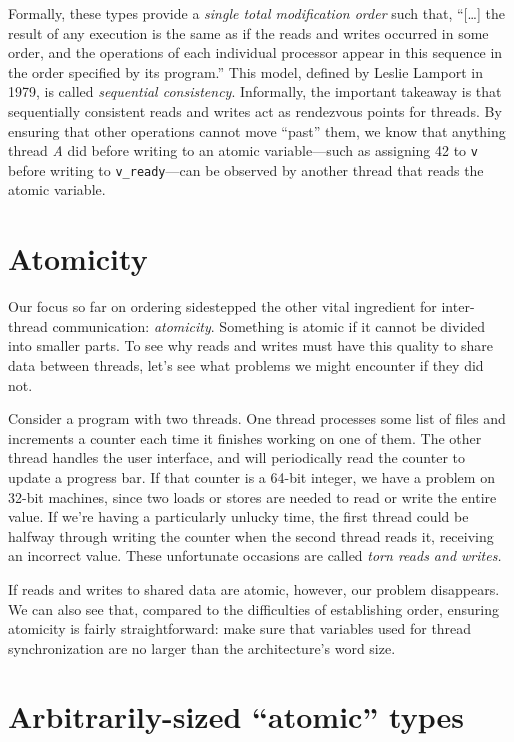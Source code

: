 \documentclass[fontsize=10pt, numbers=endperiod]{scrartcl}
\newcommand{\monobox}[1]{\mbox{\texttt{#1}}}
\newcommand{\introduce}[1]{\textit{#1}}
\begin{document}
\begin{multicols*}{2}
Formally, these types provide a \textit{single total modification order}
such that,
``[\ldots] the result of any execution is the same as if the reads and writes
occurred in some order, and the operations of each individual
processor appear in this sequence in the order specified by its program.''
This model, defined by Leslie Lamport in 1979,
is called \introduce{sequential consistency}.
Informally, the important takeaway is that sequentially consistent reads
and writes act as rendezvous points for threads.
By ensuring that other operations cannot move ``past'' them,
we know that anything thread \textit{A} did before writing to an atomic
variable---such as assigning 42 to \texttt{v} before writing to
\monobox{v\_ready}---can be observed by another thread that reads the
atomic variable.

\section{Atomicity}
\label{atomicity}

Our focus so far on ordering sidestepped the other vital ingredient for
inter-thread communication: \introduce{atomicity}.
Something is atomic if it cannot be divided into smaller parts.
To see why reads and writes must have this quality to share data between threads,
let's see what problems we might encounter if they did not.

Consider a program with two threads.
One thread processes some list of files
and increments a counter each time it finishes working on one of them.
The other thread handles the user interface, and will periodically read
the counter to update a progress bar.
If that counter is a 64-bit integer, we have a problem on 32-bit machines,
since two loads or stores are needed to read or write the entire value.
If we're having a particularly unlucky time,
the first thread could be halfway through writing the counter
when the second thread reads it, receiving an incorrect value.
These unfortunate occasions are called \introduce{torn reads and writes.}

If reads and writes to shared data are atomic, however,
our problem disappears.
We can also see that, compared to the difficulties of establishing order,
ensuring atomicity is fairly straightforward:
make sure that variables used for thread synchronization are no larger than
the architecture's word size.

\section{Arbitrarily-sized “atomic” types}


\end{multicols*}
\end{document}
